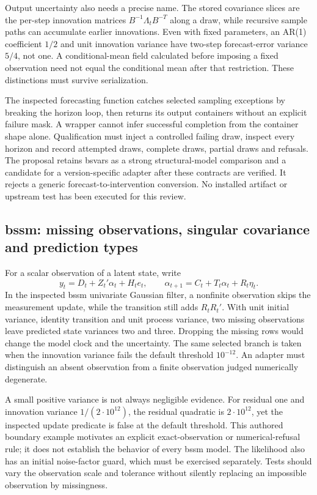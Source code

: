 Output uncertainty also needs a precise name. The stored covariance slices are the per-step innovation matrices $B^{-1}\Lambda_tB^{-T}$ along a draw, while recursive sample paths can accumulate earlier innovations. Even with fixed parameters, an AR(1) coefficient $1/2$ and unit innovation variance have two-step forecast-error variance $5/4$, not one. A conditional-mean field calculated before imposing a fixed observation need not equal the conditional mean after that restriction. These distinctions must survive serialization.~\citep{exec25_cdyn_bsvars,exec25_cdyn_choice}

The inspected forecasting function catches selected sampling exceptions by breaking the horizon loop, then returns its output containers without an explicit failure mask. A wrapper cannot infer successful completion from the container shape alone. Qualification must inject a controlled failing draw, inspect every horizon and record attempted draws, complete draws, partial draws and refusals. The proposal retains bsvars as a strong structural-model comparison and a candidate for a version-specific adapter after these contracts are verified. It rejects a generic forecast-to-intervention conversion. No installed artifact or upstream test has been executed for this review.

\subsection{bssm: missing observations, singular covariance and prediction types}

For a scalar observation of a latent state, write
\[
 y_t=D_t+Z_t'\alpha_t+H_t e_t,\qquad
 \alpha_{t+1}=C_t+T_t\alpha_t+R_t\eta_t.
\]
In the inspected bssm univariate Gaussian filter, a nonfinite observation skips the measurement update, while the transition still adds $R_tR_t'$. With unit initial variance, identity transition and unit process variance, two missing observations leave predicted state variances two and three. Dropping the missing rows would change the model clock and the uncertainty. The same selected branch is taken when the innovation variance fails the default threshold $10^{-12}$. An adapter must distinguish an absent observation from a finite observation judged numerically degenerate.~\citep{exec25_cdyn_bssm,exec25_cdyn_choice}

A small positive variance is not always negligible evidence. For residual one and innovation variance $1/(2\cdot10^{12})$, the residual quadratic is $2\cdot10^{12}$, yet the inspected update predicate is false at the default threshold. This authored boundary example motivates an explicit exact-observation or numerical-refusal rule; it does not establish the behavior of every bssm model. The likelihood also has an initial noise-factor guard, which must be exercised separately. Tests should vary the observation scale and tolerance without silently replacing an impossible observation by missingness.~\citep{exec25_cdyn_bssm,exec25_cdyn_choice}

